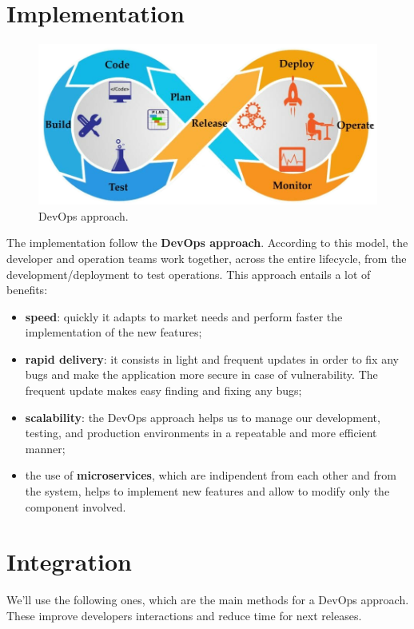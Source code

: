 \section{Implementation}

\begin{figure}[H]
  \label{fig:devops}
  \centering
  \includegraphics[scale=0.35]{images/devops.png}
  \caption{DevOps approach.}
\end{figure}

The implementation follow the \textbf{DevOps approach}.
According to this model, the developer and operation teams work together, across the entire lifecycle, from the development/deployment to test operations.
This approach entails a lot of benefits:
\begin{itemize}
\item \textbf{speed}: quickly it adapts to market needs and perform faster the implementation of the new features; 
\item \textbf{rapid delivery}: it consists in light and frequent updates in order to fix any bugs and make the application more secure in case of vulnerability.
The frequent update makes easy finding and fixing any bugs;
\item \textbf{scalability}: the DevOps approach helps us to manage our development, testing, and production environments in a repeatable and more efficient manner;
\item the use of \textbf{microservices}, which are indipendent from each other and from the system, helps to implement new features and allow to modify only the component involved.
\end{itemize}



\section{Integration}
We'll use the following ones, which are the main methods for a DevOps approach. These improve developers interactions and reduce time for next releases.
\bigskip

